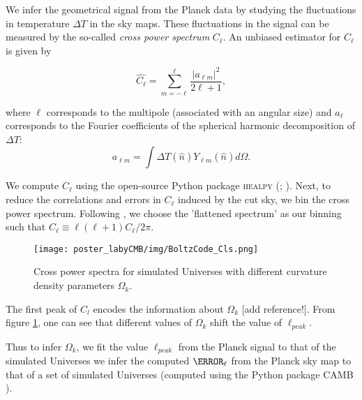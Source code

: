 We infer the geometrical signal from the Planck data by studying the fluctuations in temperature $\Delta T$ in the sky maps. These fluctuations in the signal can be measured by the so-called \textit{cross power spectrum} $C_{\ell}$. An unbiased estimator for $C_{\ell}$ \cite{tristram:2005} is given by 

\begin{equation}
\widehat{C_{\ell}}=\sum_{m=-\ell}^{\ell} \frac{\left|a_{\ell m}\right|^{2}}{2 \ell+1},
\end{equation}
\vspace{1em}

where $\ell$ corresponds to the multipole (associated with an angular size) and $a_{\ell}$ corresponds to the Fourier coefficients of the spherical harmonic decomposition of $\Delta T$:
\begin{equation}
a_{\ell m}=\int \Delta T(\hat{n}) Y_{\ell m}(\hat{n}) d \Omega.
\end{equation}
\vspace{1em}

We compute $C_{\ell}$ using the open-source Python package \textsc{healpy} (\cite{healpy:2019}; \cite{healpix:2005}). Next, to reduce the correlations and errors in $C_{\ell}$ induced by the cut sky, we bin the cross power spectrum. Following \cite{hivon:2002}, we choose the 'flattened spectrum' as our binning such that $C_{\ell} \equiv \ell(\ell+1) C_{\ell} / 2 \pi$.


\vspace{0.2em}
\begin{figure}
	\begin{minipage}{.94\textwidth}
		\centering\texttt{[image: poster\_labyCMB/img/BoltzCode\_Cls.png]}
		\caption{Cross power spectra for simulated Universes with different curvature density parameters $\Omega_k$.}
		\label{fig: boltz_Cls}
	\end{minipage}
\end{figure}
\vspace{0.4em}


The first peak of $C_l$ encodes the information about $\Omega_k$ [add reference!]. From figure \ref{fig: boltz_Cls}, one can see that different values of $\Omega_k$ shift the value of $\ell_{peak}$.

Thus to infer $\Omega_k$, we fit the value $\ell_{peak}$ from the Planck signal to that of the simulated Universes
we infer the computed $\C_{\ell}$ from the Planck sky map to that of a set of simulated Universes (computed using the Python package \textsc{CAMB} \cite{camb:2011}).

